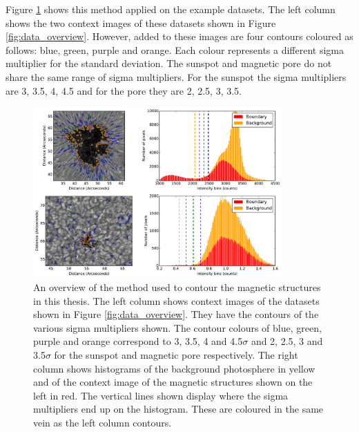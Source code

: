     Figure \ref{fig:method_overview} shows this method applied on the example datasets.
    The left column shows the two context images of these datasets shown in Figure \ref{fig:data_overview}.
    However, added to these images are four contours coloured as follows: blue, green, purple and orange.
    Each colour represents a different sigma multiplier for the standard deviation.
    The sunspot and magnetic pore do not share the same range of sigma multipliers.
    For the sunspot the sigma multipliers are 3, 3.5, 4, 4.5 and for the pore they are 2, 2.5, 3, 3.5.

    \begin{figure}
        \centering
        \includegraphics[width=0.85\textwidth]{method_overview.pdf}
        \caption{
                An overview of the method used to contour the magnetic structures in this thesis.
                The left column shows context images of the datasets shown in Figure \ref{fig:data_overview}.
                They have the contours of the various sigma multipliers shown.
                The contour colours of blue, green, purple and orange correspond to 3, 3.5, 4 and 4.5$\sigma$ and 2, 2.5, 3 and 3.5$\sigma$ for the sunspot and magnetic pore respectively.
                The right column shows histograms of the background photosphere in yellow and of the context image of the magnetic structures shown on the left in red.
                The vertical lines shown display where the sigma multipliers end up on the histogram.
                These are coloured in the same vein as the left column contours.
                }
        \label{fig:method_overview}
    \end{figure}
    
